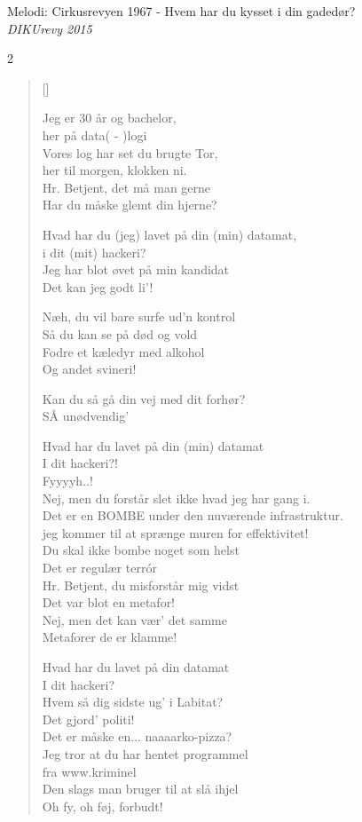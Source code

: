 {Melodi: Cirkusrevyen 1967 - Hvem har du kysset i din gadedør?}\\[.2em]
{\small\itshape DIKUrevy 2015}
\begin{multicols}2
\settowidth{\versewidth}{Vores log har set du brugte Tor,}
\begin{verse}[\versewidth]

Jeg er 30 år og bachelor,\\
her på data( - )logi\\
Vores log har set du brugte Tor, \\
her til morgen, klokken ni.   \\
Hr. Betjent, det må man gerne\\
Har du måske glemt din hjerne?
    
Hvad har du (jeg) lavet på din (min) datamat, \\
i dit (mit) hackeri?\\
Jeg har blot øvet på min kandidat\\
Det kan jeg godt li'!
    
Næh, du vil bare surfe ud'n kontrol\\
Så du kan se på død og vold\\
Fodre et kæledyr med alkohol\\
Og andet svineri!
        
Kan du så gå din vej med dit forhør?\\
SÅ unødvendig' 

Hvad har du lavet på din (min) datamat\\
I dit hackeri?!\\
Fyyyyh..!\\
Nej, men du forstår slet ikke hvad jeg har gang i. \\
Det er en BOMBE under den nuværende infrastruktur.\\
jeg kommer til at sprænge muren for effektivitet!\\

Du skal ikke bombe noget som helst\\
Det er regulær terrór\\
Hr. Betjent, du misforstår mig vidst\\
Det var blot en metafor!\\
Nej, men det kan vær' det samme\\
Metaforer de er klamme!

Hvad har du lavet på din datamat\\
I dit hackeri?\\
Hvem så dig sidste ug' i Labitat?\\
Det gjord' politi!\\
Det er måske en... naaaarko-pizza?\\
  Jeg tror at du har hentet programmel \\
  fra www.kriminel\\
  Den slags man bruger til at slå ihjel \\
  Oh fy, oh føj, forbudt! 


\end{verse}
\end{multicols}
